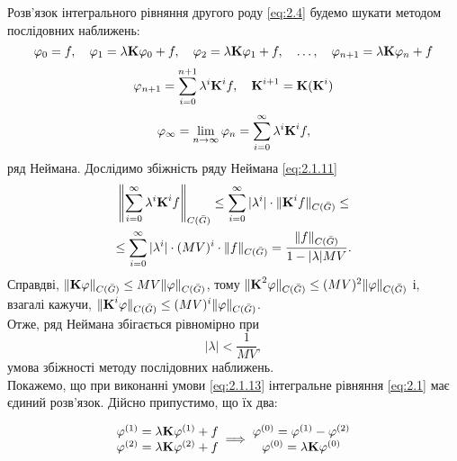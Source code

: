 Розв’язок інтегрального рівняння другого роду \eqref{eq:2.4} будемо шукати методом послідовних наближень:
\begin{equation}
	\label{eq:2.1.9}
	\phi_0 = f, \quad \phi_1 = \lambda \bf{K} \phi_0 + f, \quad \phi_2 = \lambda \bf{K} \phi_1 + f, \quad \ldots, \quad \phi_{n + 1} = \lambda \bf{K} \phi_n + f
\end{equation}
\begin{equation}
	\label{eq:2.1.10}
	\phi_{n + 1} = \Sum_{i = 0}^{n + 1} \lambda^i \bf{K}^i f, \quad \bf{K}^{i + 1} = \bf{K} (\bf{K}^i)
\end{equation}
\begin{equation}
	\label{eq:2.1.11}
	\phi_\infty = \Lim_{n \to \infty} \phi_{n} = \Sum_{i = 0}^\infty \lambda^i \bf{K}^i f,
\end{equation}
ряд Неймана. Дослідимо збіжність ряду Неймана \eqref{eq:2.1.11}
\begin{multline}
	\label{eq:2.1.12}
	\left\| \Sum_{i = 0}^\infty \lambda^i \bf{K}^i f \right\|_{C(\bar G)} \le \Sum_{i = 0}^\infty |\lambda^i| \cdot \| \bf{K}^i f \|_{C(\bar G)} \le \\
	\le \Sum_{i = 0}^\infty |\lambda^i| \cdot (MV)^i \cdot \| f \|_{C(\bar G)} = \dfrac{\|f\|_{C(\bar G)}}{1 - |\lambda| MV}.
\end{multline}
Справдві, $\| \bf{K} \phi\|_{C(\bar G)} \le MV \|\phi\|_{C(\bar G)}$, тому $\|\bf{K}^2\phi\|_{C(\bar G)} \le (MV)^2 \|\phi\|_{C(\bar G)}$ і, взагалі кажучи, $\|\bf{K}^i\phi\|_{C(\bar G)} \le (MV)^i \|\phi\|_{C(\bar G)}$. \\

Отже, ряд Неймана збігається рівномірно при 
\begin{equation}
	\label{eq:2.1.13}
	|\lambda| < \dfrac{1}{MV},
\end{equation} 
умова збіжності методу послідовних наближень. \\

Покажемо, що при виконанні умови \eqref{eq:2.1.13} інтегральне рівняння \eqref{eq:2.1} має єдиний розв’язок. Дійсно припустимо, що їх два:

\begin{equation*}
	\begin{matrix}
		\phi^{(1)} = \lambda \bf{K} \phi^{(1)} + f \\
		\phi^{(2)} = \lambda \bf{K} \phi^{(2)} + f
	\end{matrix}
	\implies
	\begin{matrix}
		\phi^{(0)} = \phi^{(1)} - \phi^{(2)}  \\
		\phi^{(0)} = \lambda \bf{K} \phi^{(0)}
	\end{matrix}
\end{equation*}

